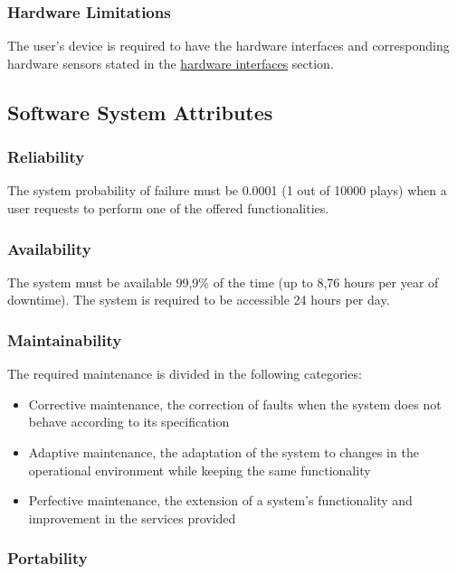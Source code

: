 \subsubsection{Hardware Limitations}

	The user's device is required to have the hardware interfaces and corresponding hardware sensors stated in the \hyperref[sec:hardwareinterfaces2]{hardware interfaces} section.
	
\subsection{Software System Attributes}

\subsubsection{Reliability}

	The system probability of failure must be 0.0001 (1 out of 10000 plays) when a user requests to perform one of the offered functionalities. 
	
\subsubsection{Availability}

	The system must be available 99,9\% of the time (up to 8,76 hours per year of downtime). The system is required to be accessible 24 hours per day.
	
\subsubsection{Maintainability}

	The required maintenance is divided in the following categories:
	
	\begin{itemize}
		\item Corrective maintenance, the correction of faults when the system does not behave according to its specification
		\item Adaptive maintenance, the adaptation of the system to changes in the operational environment while keeping the same functionality
		\item Perfective maintenance, the extension of a system's functionality and improvement in the services provided
	\end{itemize}

\subsubsection{Portability}


